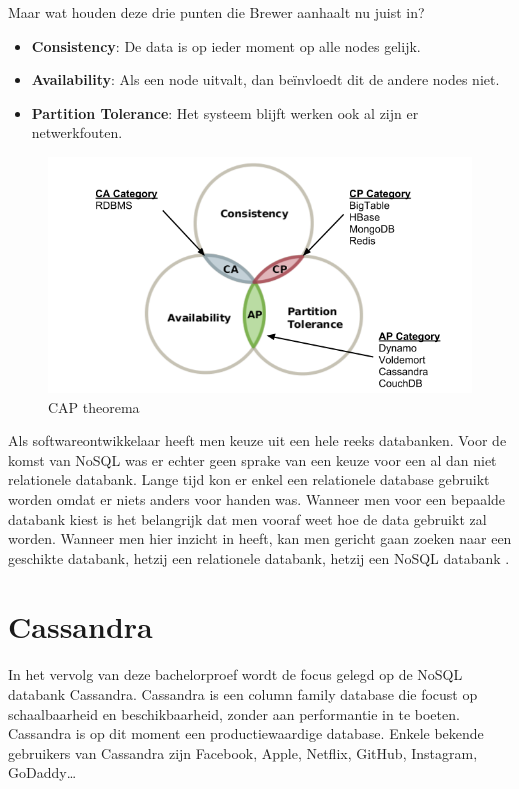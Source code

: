 Maar wat houden deze drie punten die Brewer aanhaalt nu juist in?

\begin{itemize}
	\item \textbf{Consistency}: De data is op ieder moment op alle nodes gelijk.
	\item \textbf{Availability}: Als een node uitvalt, dan beïnvloedt dit de andere nodes niet.
	\item \textbf{Partition Tolerance}: Het systeem blijft werken ook al zijn er netwerkfouten.
\end{itemize}

\begin{figure}[H]
	\centering
	\includegraphics[width=1\textwidth]{img/2_inleiding/cap}
	\caption{CAP theorema \citep{Alvarado2014CAP}}
	\label{fig:cap}
\end{figure}

Als softwareontwikkelaar heeft men keuze uit een hele reeks databanken.
Voor de komst van NoSQL was er echter geen sprake van een keuze voor een al dan niet relationele databank.
Lange tijd kon er enkel een relationele database gebruikt worden omdat er niets anders voor handen was.
Wanneer men voor een bepaalde databank kiest is het belangrijk dat men vooraf weet hoe de data gebruikt zal worden.
Wanneer men hier inzicht in heeft, kan men gericht gaan zoeken naar een geschikte databank, hetzij een relationele databank, hetzij een NoSQL databank \citep{Sadalage2014OverviewNoSQL}.

\section{Cassandra}

In het vervolg van deze bachelorproef wordt de focus gelegd op de NoSQL databank Cassandra.
Cassandra is een column family database die focust op schaalbaarheid en beschikbaarheid, zonder aan performantie in te boeten.
Cassandra is op dit moment een productiewaardige database.
Enkele bekende gebruikers van Cassandra zijn Facebook, Apple, Netflix, GitHub, Instagram, GoDaddy\dots

